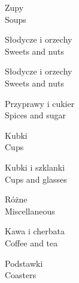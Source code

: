 \documentclass{article}
\newenvironment{centered}
{
    \topskip0pt
    \vspace*{\fill}
        \begin{center}
}
{
        \end{center}
    \vspace*{\fill}
}
\begin{document}
\fontsize{30}{36}\selectfont
        \begin{centered}
            Zupy \\
            Soups
        \end{centered}
        \newpage
        \begin{centered}
            Słodycze i orzechy \\
            Sweets and nuts
        \end{centered}
        \newpage
        \begin{centered}
            Słodycze i orzechy \\
            Sweets and nuts
        \end{centered}
        \newpage
        \begin{centered}
            Przyprawy i cukier \\
            Spices and sugar
        \end{centered}
        \newpage
        \begin{centered}
            Kubki \\
            Cups
        \end{centered}
        \newpage
        \begin{centered}
            Kubki i szklanki \\
            Cups and glasses
        \end{centered}
        \newpage
        \begin{centered}
            Różne \\
            Miscellaneous
        \end{centered}
        \newpage
        \begin{centered}
            Kawa i cherbata \\
            Coffee and tea
        \end{centered}
        \newpage
        \begin{centered}
            Podstawki \\
            Coasters
        \end{centered}
\end{document}

